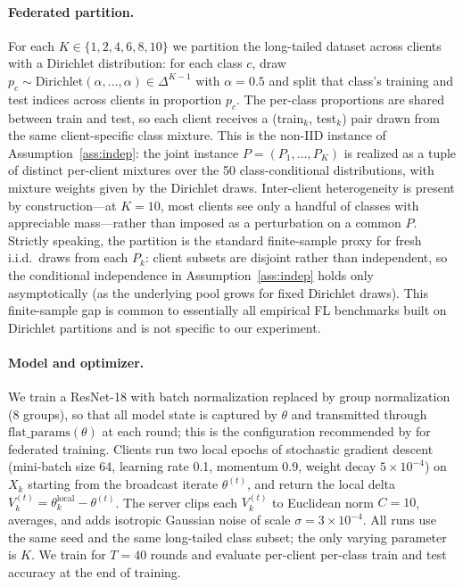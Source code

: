 \paragraph{Federated partition.} For each \(K\in\{1,2,4,6,8,10\}\) we partition the long-tailed dataset across clients with a Dirichlet distribution: for each class \(c\), draw \(p_c\sim\mathrm{Dirichlet}(\alpha,\dots,\alpha)\in\Delta^{K-1}\) with \(\alpha=0.5\) and split that class's training and test indices across clients in proportion \(p_c\). The per-class proportions are shared between train and test, so each client receives a (train\(_k\), test\(_k\)) pair drawn from the same client-specific class mixture. This is the non-IID instance of Assumption~\ref{ass:indep}: the joint instance \(P=(P_1,\dots,P_K)\) is realized as a tuple of distinct per-client mixtures over the 50 class-conditional distributions, with mixture weights given by the Dirichlet draws. Inter-client heterogeneity is present by construction---at \(K=10\), most clients see only a handful of classes with appreciable mass---rather than imposed as a perturbation on a common \(P\). Strictly speaking, the partition is the standard finite-sample proxy for fresh i.i.d.\ draws from each \(P_k\): client subsets are disjoint rather than independent, so the conditional independence in Assumption~\ref{ass:indep} holds only asymptotically (as the underlying pool grows for fixed Dirichlet draws). This finite-sample gap is common to essentially all empirical FL benchmarks built on Dirichlet partitions and is not specific to our experiment.

\paragraph{Model and optimizer.} We train a ResNet-18 \citep{He2016ResNet} with batch normalization replaced by group normalization (8 groups), so that all model state is captured by \(\theta\) and transmitted through \(\mathrm{flat\_params}(\theta)\) at each round; this is the configuration recommended by \citet{Hsieh2020NonIID} for federated training. Clients run two local epochs of stochastic gradient descent (mini-batch size 64, learning rate 0.1, momentum 0.9, weight decay \(5\times 10^{-4}\)) on \(X_k\) starting from the broadcast iterate \(\theta^{(t)}\), and return the local delta \(V_k^{(t)}=\theta_k^{\mathrm{local}}-\theta^{(t)}\). The server clips each \(V_k^{(t)}\) to Euclidean norm \(C=10\), averages, and adds isotropic Gaussian noise of scale \(\sigma=3\times 10^{-4}\). All runs use the same seed and the same long-tailed class subset; the only varying parameter is \(K\). We train for \(T=40\) rounds and evaluate per-client per-class train and test accuracy at the end of training.

